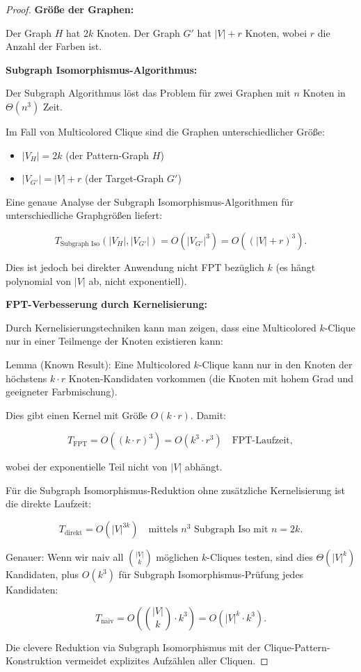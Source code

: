 ﻿\documentclass[a4paper,12pt]{article}
\theoremstyle{definition}
\begin{document}
\begin{proof}
	\textbf{Größe der Graphen:}
	
	Der Graph $H$ hat $2k$ Knoten.
	Der Graph $G'$ hat $|V| + r$ Knoten, wobei $r$ die Anzahl der Farben ist.
	
	\textbf{Subgraph Isomorphismus-Algorithmus:}
	
	Der Subgraph Algorithmus löst das Problem für zwei Graphen mit $n$ Knoten in $\Theta(n^3)$ Zeit.
	
	Im Fall von Multicolored Clique sind die Graphen unterschiedlicher Größe:
	\begin{itemize}
		\item $|V_H| = 2k$ (der Pattern-Graph $H$)
		\item $|V_{G'}| = |V| + r$ (der Target-Graph $G'$)
	\end{itemize}
	
	Eine genaue Analyse der Subgraph Isomorphismus-Algorithmen für unterschiedliche Graphgrößen liefert:
	
	\[
	T_{\text{Subgraph Iso}}(|V_H|, |V_{G'}|) = O(|V_{G'}|^3) = O((|V| + r)^3).
	\]
	
	Dies ist jedoch bei direkter Anwendung nicht FPT bezüglich $k$ (es hängt polynomial von $|V|$ ab, nicht exponentiell).
	
	\textbf{FPT-Verbesserung durch Kernelisierung:}
	
	Durch Kernelisierungstechniken kann man zeigen, dass eine Multicolored $k$-Clique nur in einer Teilmenge der Knoten existieren kann:
	
	Lemma (Known Result): Eine Multicolored $k$-Clique kann nur in den Knoten der höchstens $k \cdot r$ Knoten-Kandidaten vorkommen (die Knoten mit hohem Grad und geeigneter Farbmischung).
	
	Dies gibt einen Kernel mit Größe $O(k \cdot r)$. Damit:
	
	\[
	T_{\text{FPT}} = O((k \cdot r)^3) = O(k^3 \cdot r^3) \quad \text{FPT-Laufzeit},
	\]
	
	wobei der exponentielle Teil nicht von $|V|$ abhängt.
	
	Für die Subgraph Isomorphismus-Reduktion ohne zusätzliche Kernelisierung ist die direkte Laufzeit:
	
	\[
	T_{\text{direkt}} = O(|V|^{3k}) \quad \text{mittels } n^3 \text{ Subgraph Iso mit } n = 2k.
	\]
	
	Genauer: Wenn wir naiv all ${|V| \choose k}$ möglichen $k$-Cliques testen, sind dies $\Theta(|V|^k)$ Kandidaten, plus $O(k^3)$ für Subgraph Isomorphismus-Prüfung jedes Kandidaten:
	
	\[
	T_{\text{naiv}} = O({|V| \choose k} \cdot k^3) = O(|V|^k \cdot k^3).
	\]
	
	Die clevere Reduktion via Subgraph Isomorphismus mit der Clique-Pattern-Konstruktion vermeidet explizites Aufzählen aller Cliquen.
\end{proof}
\end{document}
